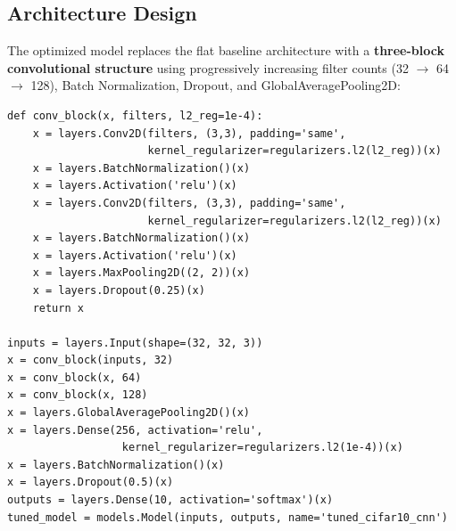 \documentclass[11pt]{article}
\begin{document}
\subsection{Architecture Design}
The optimized model replaces the flat baseline architecture with a \textbf{three-block convolutional structure} using progressively increasing filter counts (32 $\rightarrow$ 64 $\rightarrow$ 128), Batch Normalization, Dropout, and GlobalAveragePooling2D:

\begin{lstlisting}[caption={Optimized CNN architecture (conv\_block function + head)}]
def conv_block(x, filters, l2_reg=1e-4):
    x = layers.Conv2D(filters, (3,3), padding='same',
                      kernel_regularizer=regularizers.l2(l2_reg))(x)
    x = layers.BatchNormalization()(x)
    x = layers.Activation('relu')(x)
    x = layers.Conv2D(filters, (3,3), padding='same',
                      kernel_regularizer=regularizers.l2(l2_reg))(x)
    x = layers.BatchNormalization()(x)
    x = layers.Activation('relu')(x)
    x = layers.MaxPooling2D((2, 2))(x)
    x = layers.Dropout(0.25)(x)
    return x

inputs = layers.Input(shape=(32, 32, 3))
x = conv_block(inputs, 32)
x = conv_block(x, 64)
x = conv_block(x, 128)
x = layers.GlobalAveragePooling2D()(x)
x = layers.Dense(256, activation='relu',
                  kernel_regularizer=regularizers.l2(1e-4))(x)
x = layers.BatchNormalization()(x)
x = layers.Dropout(0.5)(x)
outputs = layers.Dense(10, activation='softmax')(x)
tuned_model = models.Model(inputs, outputs, name='tuned_cifar10_cnn')
\end{lstlisting}
\end{document}
